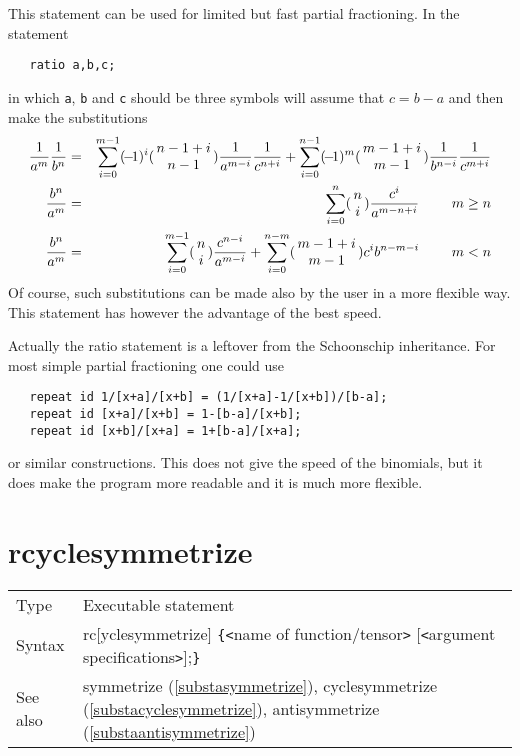 \noindent This statement can be used for limited but fast 
partial fractioning. In the statement
\begin{verbatim}
   ratio a,b,c;
\end{verbatim}
in which \verb:a:, \verb:b: and \verb:c: should be three symbols {\FORM} 
will assume that $c = b-a$ and then make the substitutions
\begin{eqnarray}
    \frac{1}{a^m}\frac{1}{b^n} & = & \sum_{i=0}^{m-1}\sign(i)
        \binom(n-1+i,n-1)\frac{1}{a^{m-i}}\frac{1}{c^{n+i}}
        +\sum_{i=0}^{n-1}\sign(m)
        \binom(m-1+i,m-1)\frac{1}{b^{n-i}}\frac{1}{c^{m+i}}
        \nonumber \\
    \frac{b^n}{a^m} & = & \sum_{i=0}^n\binom(n,i)\frac{c^i}{a^{m-n+i}}
            \ \ \ \ \ \ \ \hfill m\ge n \nonumber \\
    \frac{b^n}{a^m} & = & \sum_{i=0}^{m-1}\binom(n,i)\frac{c^{n-i}}{a^{m-i}}
        + \sum_{i=0}^{n-m}\binom(m-1+i,m-1)
            c^ib^{n-m-i}
            \ \ \ \ \ \ \ \hfill m<n \nonumber
\end{eqnarray}
\setcounter{equation}{3}
Of course, such substitutions can be made also by the user in a more 
flexible way. This statement has however the advantage of the best speed.
\vspace{4mm}

\noindent Actually the ratio statement is a leftover from the 
Schoonschip 
inheritance. For most simple partial fractioning one could use
\begin{verbatim}
   repeat id 1/[x+a]/[x+b] = (1/[x+a]-1/[x+b])/[b-a];
   repeat id [x+a]/[x+b] = 1-[b-a]/[x+b];
   repeat id [x+b]/[x+a] = 1+[b-a]/[x+a];
\end{verbatim}
or similar constructions. This does not give the speed of the 
binomials, but it does make the program more readable and 
it is much more flexible.
\vspace{10mm}

 
\section{rcyclesymmetrize}
\label{substarcyclesymmetrize}

\noindent \begin{tabular}{ll}
Type & Executable statement\\
Syntax & rc[yclesymmetrize] \verb:{:{\tt<}name of function/tensor{\tt>}
         [{\tt<}argument specifications{\tt>}];\verb:}: \\
See also & symmetrize (\ref{substasymmetrize}), cyclesymmetrize 
(\ref{substacyclesymmetrize}), antisymmetrize (\ref{substaantisymmetrize})
\end{tabular} \vspace{4mm}


